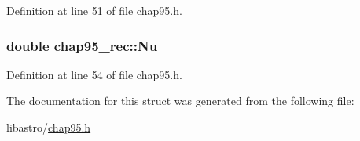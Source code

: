 Definition at line 51 of file chap95.\-h.

\hypertarget{structchap95__rec_aefec81036fd6d6df1517ead20178ddeb}{
\subsubsection[{Nu}]{\setlength{\rightskip}{0pt plus 5cm}double chap95\-\_\-rec\-::\-Nu}}\label{structchap95__rec_aefec81036fd6d6df1517ead20178ddeb}


Definition at line 54 of file chap95.\-h.



The documentation for this struct was generated from the following file\-:\begin{DoxyCompactItemize}
\item 
libastro/\hyperlink{chap95_8h}{chap95.\-h}\end{DoxyCompactItemize}
